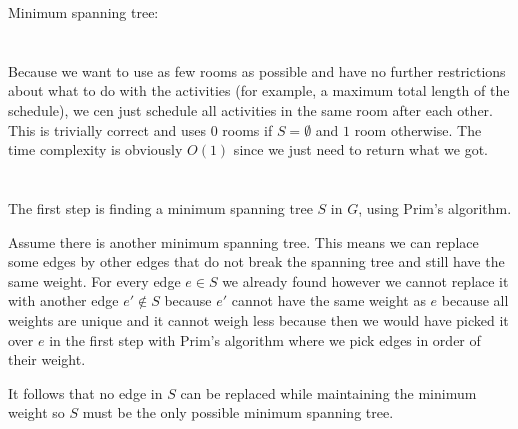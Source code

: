 \documentclass[12pt, a4paper]{article}
\begin{document}
Minimum spanning tree:

\section{} %

Because we want to use as few rooms as possible and have no further restrictions about what to do with the activities (for example, a maximum total length of the schedule), we cen just schedule all activities in the same room after each other. This is trivially correct and uses $0$ rooms if $S = \emptyset$ and $1$ room otherwise. The time complexity is obviously $O(1)$ since we just need to return what we got.

\section{} %

\section{} %

The first step is finding a minimum spanning tree $S$ in $G$, using Prim's algorithm.

Assume there is another minimum spanning tree. This means we can replace some edges by other edges that do not break the spanning tree and still have the same weight. For every edge $e \in S$ we already found however we cannot replace it with another edge $e' \not\in S$ because $e'$ cannot have the same weight as $e$ because all weights are unique and it cannot weigh less because then we would have picked it over $e$ in the first step with Prim's algorithm where we pick edges in order of their weight.

It follows that no edge in $S$ can be replaced while maintaining the minimum weight so $S$ must be the only possible minimum spanning tree.
\end{document}
